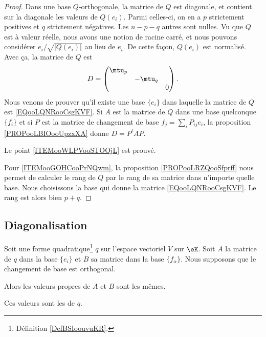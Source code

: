 \begin{proof}
    Dans une base \( Q\)-orthogonale, la matrice de \( Q\) est diagonale, et contient sur la diagonale les valeurs de \( Q(e_i)\). Parmi celles-ci, on en a \( p\) strictement positives et \( q\) strictement négatives. Les \( n-p-q\) autres sont nulles. Vu que \( Q\) est à valeur réelle, nous avons une notion de racine carré, et nous pouvons considérer \( e_i/\sqrt{ | Q(e_i) | }\) au lieu de \( e_i\). De cette façon, \( Q(e_i)\) est normalisé. Avec ça, la matrice de \( Q\) est
    \begin{equation}        \label{EQooLQNRooCsgKVF}
        D=\begin{pmatrix}
            \mtu_p    &       &       \\
                &   -\mtu_q    &       \\
                &       &   0
        \end{pmatrix}.
    \end{equation}
    Nous venons de prouver qu'il existe une base \( \{ e_i \}\) dans laquelle la matrice de \( Q\) est \eqref{EQooLQNRooCsgKVF}. Si \( A\) est la matrice de \( Q\) dans une base quelconque \( \{ f_i \}\) et si \( P\) est la matrice de changement de base \( f_j=\sum_iP_{ij}e_i\), la proposition \ref{PROPooLBIOooUpzxXA} donne \(D= P^tAP\).

    Le point \ref{ITEMooWLPVooSTOOjL} est prouvé.

    Pour \ref{ITEMooGOHCooPrNQwm}, la proposition \ref{PROPooLRZQooSfprff} nous permet de calculer le rang de \( Q\) par le rang de sa matrice dans n'importe quelle base. Nous choisissons la base qui donne la matrice \eqref{EQooLQNRooCsgKVF}. Le rang est alors bien \( p+q\).
\end{proof}

\subsection{Diagonalisation}

\begin{lemmaDef}        \label{DEFooGVGGooWQEIET}
    Soit une forme quadratique\footnote{Définition \ref{DefBSIoouvuKR}.} \( q\) sur l'espace vectoriel \( V\) sur \( \eK\). Soit \( A\) la matrice de \( q\) dans la base \( \{ e_i \}\) et \( B\) sa matrice dans la base \( \{f_{\alpha}  \}\). Nous supposons que le changement de base est orthogonal.

    Alors les valeurs propres de \( A\) et \( B\) sont les mêmes.

    Ces valeurs sont les  de \( q\).
\end{lemmaDef}

